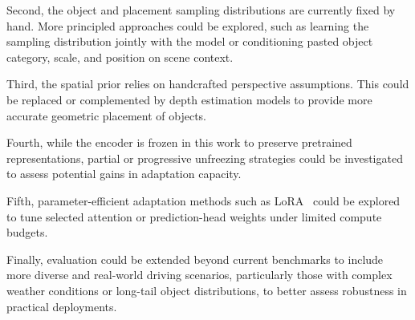 Second, the object and placement sampling distributions are currently fixed by hand. More principled approaches could be explored, such as learning the sampling distribution jointly with the model or conditioning pasted object category, scale, and position on scene context.

Third, the spatial prior relies on handcrafted perspective assumptions. This could be replaced or complemented by depth estimation models to provide more accurate geometric placement of objects.

Fourth, while the encoder is frozen in this work to preserve pretrained representations, partial or progressive unfreezing strategies could be investigated to assess potential gains in adaptation capacity.

Fifth, parameter-efficient adaptation methods such as LoRA~\cite{hu2022lora} could be explored to tune selected attention or prediction-head weights under limited compute budgets.

Finally, evaluation could be extended beyond current benchmarks to include more diverse and real-world driving scenarios, particularly those with complex weather conditions or long-tail object distributions, to better assess robustness in practical deployments.
